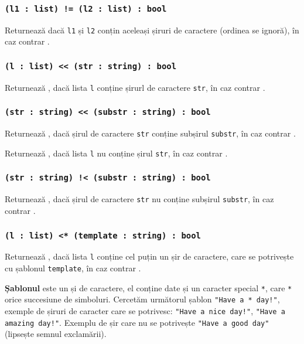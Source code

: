 \subsubsection{\texttt{(l1 : list) != (l2 : list) : bool}}

Returnează \false{} dacă \texttt{l1} și \texttt{l2} conțin aceleași șiruri de caractere (ordinea se ignoră), în caz contrar \true{}.

\subsubsection{\texttt{(l : list) << (str : string) : bool}}

Returnează \true{}, dacă lista \texttt{l} conține șirurl de caractere \texttt{str}, în caz contrar \false{}.

\subsubsection{\texttt{(str : string) << (substr : string) : bool}}

Returnează \true{}, dacă șirul de caractere \texttt{str} conține subșirul \texttt{substr}, în caz contrar \false{}.

Returnează \true{}, dacă lista \texttt{l} nu conține șirul \texttt{str}, în caz contrar \false{}.

\subsubsection{\texttt{(str : string) !< (substr : string) : bool}}

Returnează \true{}, dacă șirul de caractere \texttt{str} nu conține subșirul \texttt{substr}, în caz contrar \false{}.

\subsubsection{\texttt{(l : list) <* (template : string) : bool}}

Returnează \true{}, dacă lista \texttt{l} conține cel puțin un șir de caractere, care se potrivește cu șablonul \texttt{template}, în caz contrar \false{}.

{\bf Șablonul} este un și de caractere, el conține date și un caracter special \texttt{*}, care \texttt{*} orice succesiune de simboluri. Cercetăm următorul șablon \texttt{"Have a * day!"}, exemple de șiruri de caracter care se potrivesc: \texttt{"Have a nice day!"}, \texttt{"Have a amazing day!"}. Exemplu de șir care nu se potrivește \texttt{"Have a good day"} (lipsește semnul exclamării).

